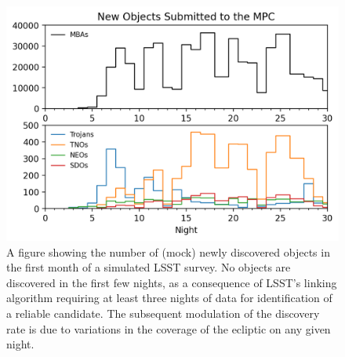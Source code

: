 \begin{figure}
	\centering
	\includegraphics[width=0.9\columnwidth]{discovery_rates.png}
	\caption{A figure showing the number of (mock) newly discovered objects in the first month of a simulated LSST survey. No objects are discovered in the first few nights, as a consequence of LSST's linking algorithm requiring at least three nights of data for identification of a reliable candidate. The subsequent modulation of the discovery rate is due to variations in the coverage of the ecliptic on any given night.}
	\label{fig:lsst_submissions}
\end{figure}


